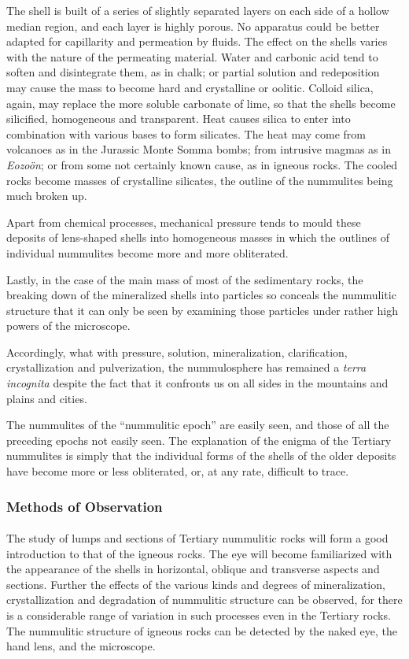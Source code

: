 \documentclass[a4paper, 12pt, oneside, landscape]{article}
\begin{document}
The shell is built of a series of slightly separated layers on each side of a hollow median region, and each layer is highly porous. No apparatus could be better adapted for capillarity and permeation by fluids. The effect on the shells varies with the nature of the permeating material. Water and carbonic acid tend to soften and disintegrate them, as in chalk; or partial solution and redeposition may cause the mass to become hard and crystalline or oolitic. Colloid silica, again, may replace the more soluble carbonate of lime, so that the shells become silicified, homogeneous and transparent. Heat causes silica to enter into combination with various bases to form silicates. The heat may come from volcanoes as in the Jurassic Monte Somma bombs; from intrusive magmas as in \emph{Eozoön}; or from some not certainly known cause, as in igneous rocks. The cooled rocks become masses of crystalline silicates, the outline of the nummulites being much broken up.

Apart from chemical processes, mechanical pressure tends to mould these deposits of lens-shaped shells into homogeneous masses in which the outlines of individual nummulites become more and more obliterated.

Lastly, in the case of the main mass of most of the sedimentary rocks, the breaking down of the mineralized shells into particles so conceals the nummulitic structure that it can only be seen by examining those particles under rather high powers of the microscope.

Accordingly, what with pressure, solution, mineralization, clarification, crystallization and pulverization, the nummulosphere has remained a \emph{terra incognita} despite the fact that it confronts us on all sides in the mountains and plains and cities.

The nummulites of the ``nummulitic epoch'' are easily seen, and those of all the preceding epochs not easily seen. The explanation of the enigma of the Tertiary nummulites is simply that the individual forms of the shells of the older deposits have become more or less obliterated, or, at any rate, difficult to trace.

\subsubsection{Methods of Observation}
\paragraph{}
The study of lumps and sections of Tertiary nummulitic rocks will form a good introduction to that of the igneous rocks. The eye will become familiarized with the appearance of the shells in horizontal, oblique and transverse aspects and sections. Further the effects of the various kinds and degrees of mineralization, crystallization and degradation of nummulitic structure can be observed, for there is a considerable range of variation in such processes even in the Tertiary rocks. The nummulitic structure of igneous rocks can be detected by the naked eye, the hand lens, and the microscope.
\end{document}
